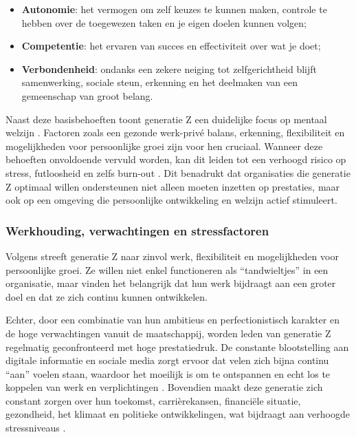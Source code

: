 \begin{itemize}
    \item \textbf{Autonomie}: het vermogen om zelf keuzes te kunnen maken, controle te hebben over de toegewezen taken en je eigen doelen kunnen volgen;
    \item \textbf{Competentie}: het ervaren van succes en effectiviteit over wat je doet;
    \item \textbf{Verbondenheid}: ondanks een zekere neiging tot zelfgerichtheid blijft samenwerking, sociale steun, erkenning en het deelmaken van een gemeenschap van groot belang.
\end{itemize}

\vspace{1em}

Naast deze basisbehoeften toont generatie Z een duidelijke focus op mentaal welzijn \autocite{Cnossen2024}. Factoren zoals een gezonde werk-privé balans, erkenning, flexibiliteit en mogelijkheden voor persoonlijke groei zijn voor hen cruciaal. Wanneer deze behoeften onvoldoende vervuld worden, kan dit leiden tot een verhoogd risico op stress, futloosheid en zelfs burn-out \autocite{Zahra2025}. Dit benadrukt dat organisaties die generatie Z optimaal willen ondersteunen niet alleen moeten inzetten op prestaties, maar ook op een omgeving die persoonlijke ontwikkeling en welzijn actief stimuleert.

\vspace{1em}

\subsubsection{Werkhouding, verwachtingen en stressfactoren}
\label{subsubsec:werkhouding-z}

\vspace{1em}

Volgens \textcite{Zahra2025} streeft generatie Z naar zinvol werk, flexibiliteit en mogelijkheden voor persoonlijke groei. Ze willen niet enkel functioneren als “tandwieltjes” in een organisatie, maar vinden het belangrijk dat hun werk bijdraagt aan een groter doel en dat ze zich continu kunnen ontwikkelen.

\vspace{1em}

Echter, door een combinatie van hun ambitieus en perfectionistisch karakter en de hoge verwachtingen vanuit de maatschappij, worden leden van generatie Z regelmatig geconfronteerd met hoge prestatiedruk. De constante blootstelling aan digitale informatie en sociale media zorgt ervoor dat velen zich bijna continu “aan” voelen staan, waardoor het moeilijk is om te ontspannen en echt los te koppelen van werk en verplichtingen \autocite{Cnossen2024}. Bovendien maakt deze generatie zich constant zorgen over hun toekomst, carrièrekansen, financiële situatie, gezondheid, het klimaat en politieke ontwikkelingen, wat bijdraagt aan verhoogde stressniveaus \autocite{Cnossen2024}. 

